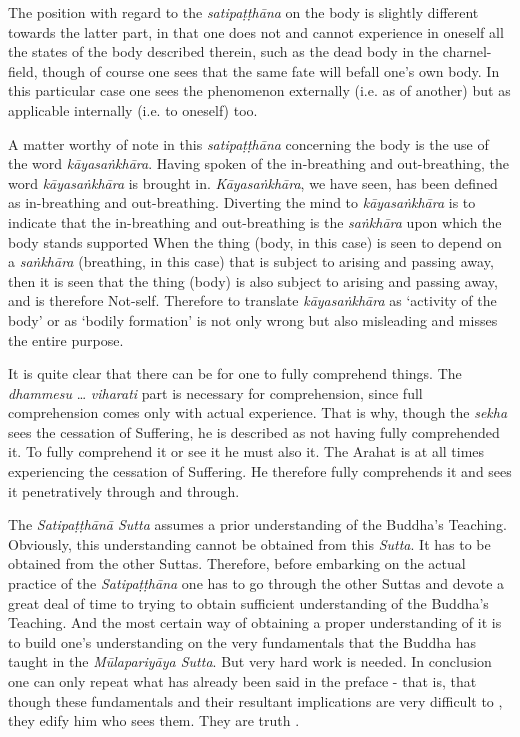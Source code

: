 The position with regard to the \emph{satipaṭṭhāna} on the body is slightly different towards the latter part, in that one does not and cannot experience in oneself all the states of the body described therein, such as the dead body in the charnel-field, though of course one sees that the same fate will befall one's own body. In this particular case one sees the phenomenon externally (i.e. as of another) but as applicable internally (i.e. to oneself) too.

A matter worthy of note in this \emph{satipaṭṭhāna} concerning the body is the use of the word \emph{kāyasaṅkhāra}. Having spoken of the in-breathing and out-breathing, the word \emph{kāyasaṅkhāra} is brought in. \emph{Kāyasaṅkhāra}, we have seen, has been defined as in-breathing and out-breathing. Diverting the mind to \emph{kāyasaṅkhāra} is to indicate that the in-breathing and out-breathing is the \emph{saṅkhāra} upon which the body stands supported When the thing (body, in this case) is seen to depend on a \emph{saṅkhāra} (breathing, in this case) that is subject to arising and passing away, then it is seen that the thing (body) is also subject to arising and passing away, and is therefore Not-self. Therefore to translate \emph{kāyasaṅkhāra} as `activity of the body' or as `bodily formation' is not only wrong but also misleading and misses the entire purpose.

It is quite clear that there can be  for one to fully comprehend things. The \emph{dhammesu} \ldots\hspace{0pt} \emph{viharati} part is necessary for  comprehension, since full comprehension comes only with actual experience. That is why, though the \emph{sekha} sees the cessation of Suffering, he is described as not having fully comprehended it. To fully comprehend it or  see it  he must also  it. The Arahat is at all times experiencing the cessation of Suffering. He therefore fully comprehends it and sees it penetratively through and through.

\label{ch-16-truth-for-him}The \emph{Satipaṭṭhānā Sutta} assumes a prior understanding of the Buddha's Teaching. Obviously, this understanding cannot be obtained from this \emph{Sutta}. It has to be obtained from the other Suttas. Therefore, before embarking on the actual practice of the \emph{Satipaṭṭhāna} one has to go through the other Suttas and devote a great deal of time to trying to obtain sufficient understanding of the Buddha's Teaching. And the most certain way of obtaining a proper understanding of it is to build one's understanding on the very fundamentals that the Buddha has taught in the \emph{Mūlapariyāya Sutta}. But very hard work is needed. In conclusion one can only repeat what has already been said in the preface - that is, that though these fundamentals and their resultant implications are very difficult to , they edify him who sees them. They are truth .

